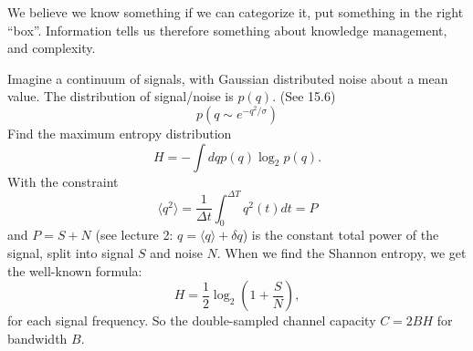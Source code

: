\documentclass{slides}
\begin{document}

We believe we know something if we can categorize it, put something
in the right ``box''. Information tells us therefore something about
knowledge management, and complexity.


Imagine a continuum of signals, with Gaussian distributed noise about a mean
value. The distribution of signal/noise is $p(q)$. (See 15.6)
$$
p(q \sim e^{-q^2/\sigma})
$$
Find the maximum entropy distribution
$$
H = - \int dq p(q) \log_2 p(q).
$$
With the constraint
$$
\langle q^2\rangle = \frac{1}{\Delta t} \int_0^{\Delta T} q^2(t)dt = P
$$
and $P=S+N$ (see lecture 2: $q=\langle q\rangle+\delta q$) is the constant total power of the signal, split into signal $S$ and noise $N$.
When we find the Shannon entropy, we get the well-known formula:
$$
H = \frac{1}{2}\log_2\left(1+\frac{S}{N}\right),
$$
for each signal frequency. So the double-sampled channel capacity $C =
2BH$ for bandwidth $B$.
\end{document}
